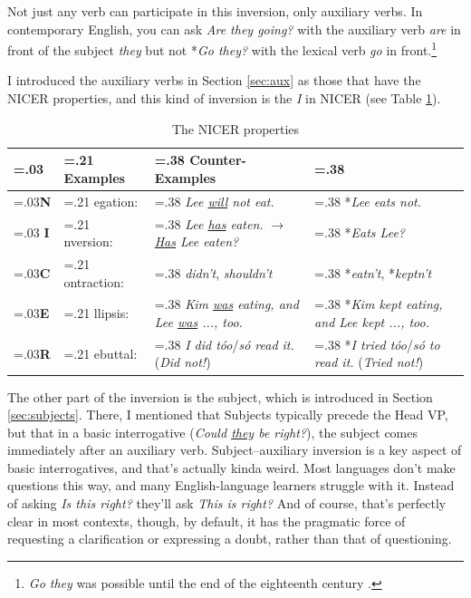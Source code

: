Not just any verb can participate in this inversion, only auxiliary verbs. In contemporary English, you can ask \textit{Are they going?} with the auxiliary verb \textit{are} in front of the subject \textit{they} but not *\textit{Go they?} with the lexical verb \textit{go} in front.\footnote{\textit{Go they} was possible until the end of the eighteenth century \citep[239]{Lass1999}.}

I introduced the auxiliary verbs in Section \ref{sec:aux} as those that have the NICER properties, and this kind of inversion is the \textit{I} in NICER (see Table \ref{tab:NICER2}).

\begin{table}
    \centering
    \begin{tabularx}{0.80\textwidth}{@{} >{\centering\arraybackslash\hsize=.03\hsize}X >{\hsize=.21\hsize}X >{\hsize=.38\hsize}X >{\hsize=.38\hsize}X @{}}
    \multicolumn{2}{>{\hsize=.24\hsize}X}{\textbf{Feature}} & \textbf{Examples} & \textbf{Counter-Examples} \\
    \hline
    \textbf{N} & egation:& \textit{Lee \uline{will} not eat.} & *\textit{Lee eats not.} \\
    \rowcolor{gray!20} %
    \textbf{I} & nversion:& \textit{Lee \uline{has} eaten.} \(\rightarrow\) \newline \textit{\uline{Has} Lee eaten?} & *\textit{Eats Lee?} \\
    \textbf{C} & ontraction:& \textit{didn't}, \textit{shouldn't} & *\textit{eatn't}, *\textit{keptn't} \\
    \textbf{E} & llipsis:& \textit{Kim \uline{was} eating, and \newline Lee \uline{was} ..., too.} & *\textit{Kim kept eating, and \newline Lee kept ..., too.} \\
    \textbf{R} & ebuttal:& \textit{I did tóo}/\textit{só read it.} \newline (\textit{Did not!}) & *\textit{I tried tóo}/\textit{só to read it.} (\textit{Tried not!}) \\
\end{tabularx}
\caption{The NICER properties}\label{tab:NICER2}
\end{table}

The other part of the inversion is the subject, which is introduced in Section \ref{sec:subjects}. There, I mentioned that \textsf{Subjects} typically precede the \textsf{Head} VP, but that in a basic interrogative (\textit{Could \uline{they} be right?}), the subject comes immediately after an auxiliary verb. \textsf{Subject}--auxiliary inversion is a key aspect of basic interrogatives, and that's actually kinda weird. Most languages don't make questions this way, and many English-language learners struggle with it. Instead of asking \textit{Is this right?} they'll ask \textit{This is right?} And of course, that's perfectly clear in most contexts, though, by default, it has the pragmatic force of requesting a clarification or expressing a doubt, rather than that of questioning.

